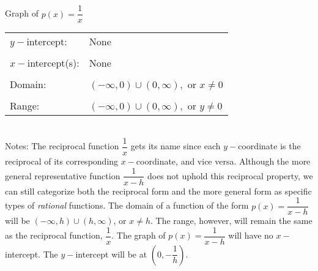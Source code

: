 \documentclass[12pt]{book}
\theoremstyle{definition}
\begin{document}
\begin{multicols}{2}
\columnbreak
~\\
\vspace{0.5in}
~\\
\begin{center}
\end{center}
\begin{center}
Graph of $p(x)=\dfrac{1}{x}$
\end{center}
\end{multicols}
\begin{tabular}{ll}
$y-$intercept: & None\\
&\\
$x-$intercept(s): & None\\
&\\
Domain: & $(-\infty,0)\cup(0,\infty),$ or $x\neq 0$\\
&\\
Range: & $(-\infty,0)\cup(0,\infty),$ or $y\neq 0$
\end{tabular}
\\

Notes: The reciprocal function $\dfrac{1}{x}$ gets its name since each $y-$coordinate is the reciprocal of its corresponding $x-$coordinate, and vice versa.  Although the more general representative function $\dfrac{1}{x-h}$ does not uphold this reciprocal property, we can still categorize both the reciprocal form and the more general form as specific types of {\it rational} functions.  The domain of a function of the form $p(x)=\dfrac{1}{x-h}$ will be $(-\infty,h)\cup(h,\infty)$, or $x\neq h$.  The range, however, will remain the same as the reciprocal function, $\dfrac{1}{x}$.  The graph of $p(x)=\dfrac{1}{x-h}$ will have no $x-$intercept.  The $y-$intercept will be at $\left(0,-\dfrac{1}{h}\right)$. 
\end{document}
